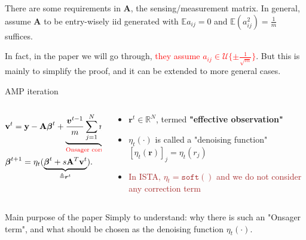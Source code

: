 \documentclass[aspectratio=43, 10pt]{beamer}
\begin{document}
\begin{frame}
    There are some requirements in $\boldsymbol{A}$, the sensing/measurement matrix. In general, assume $\boldsymbol{A}$ to be entry-wisely iid generated with $\mathbb{E} a_{ij}=0$ and $\mathbb{E} (a_{ij}^2) = \frac{1}{m}$ suffices.

    \vspace{3mm}
    In fact, in the paper we will go through, \textcolor{red}{they assume $a_{ij} \in \mathcal{U} \{ \pm \frac{1}{\sqrt{m}}\}$}. But this is mainly to simplify the proof, and it can be extended to more general cases. 

    \pause
    
    \begin{block}{AMP iteration}
        \begin{columns}
            \begin{column}{0.5\textwidth}
                \begin{align}
                    &\bold{v}^{t} = \bold{y} - \bold{A} \boldsymbol{\beta}^t + \underbrace{\frac{\boldsymbol{v}^{t-1}}{m} \sum_{j=1}^N \eta_{t-1}'(r_j^{t-1})}_{\textcolor{red}{\text{Onsager correction term}}} \notag \\ 
                    & \boldsymbol{\beta}^{t+1} = \eta_t( \underbrace{\boldsymbol{\beta}^{t}+s\bold{A}^T \bold{v}^{t}}_{\triangleq \boldsymbol{r}^{t}} ). \notag 
                \end{align}
            \end{column}
    
            \hspace{-5mm}
            \begin{column}{0.6\textwidth}
                \begin{itemize}
                    \item $\boldsymbol{r}^t \in \mathbb{R}^{N}$, termed \textbf{"effective observation"}
                    \item $\eta_t(\cdot)$ is called a "denoising function" $[\eta_t(\boldsymbol{r})]_j = \eta_t(r_j)$ 
                    \item \textcolor{brown}{In ISTA, $\eta_t =\texttt{soft}()$ and we do not consider any correction term}
                \end{itemize}
            \end{column}
        \end{columns}
    \end{block}
    
    \begin{block}{Main purpose of the paper}
        Simply to understand: why there is such an "Onsager term", and what should be chosen as the denoising function $\eta_t(\cdot)$. 
    \end{block}
\end{frame}
\end{document}
